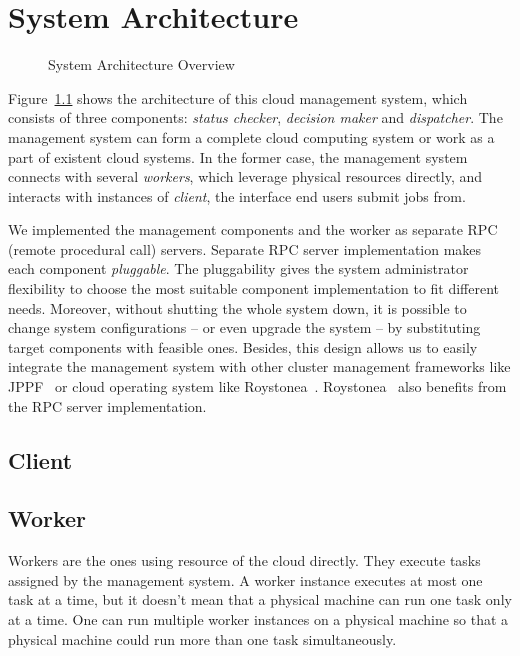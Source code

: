 \chapter{System Architecture}

\begin{figure}
  \centering
  
  \caption{System Architecture Overview}
  \label{fig:archi-overview}
\end{figure}


Figure~\ref{fig:archi-overview} shows the architecture of this cloud
management system, which consists of three components: \emph{status
checker}, \emph{decision maker} and \emph{dispatcher}.  The management
system can form a complete cloud computing system or work as a part of
existent cloud systems.  In the former case, the management system
connects with several \emph{workers}, which leverage physical resources
directly, and interacts with instances of \emph{client}, the interface
end users submit jobs from.

We implemented the management components and the worker as separate RPC
(remote procedural call) servers.  Separate RPC server implementation
makes each component \emph{pluggable}.  The pluggability gives the
system administrator flexibility to choose the most suitable component
implementation to fit different needs.  Moreover, without shutting the
whole system down, it is possible to change system configurations -- or
even upgrade the system -- by substituting target components with
feasible ones.  Besides, this design allows us to easily integrate the
management system with other cluster management frameworks like
JPPF~\cite{cite:JPPF} or cloud operating system like
Roystonea~\cite{cite:roystonea}.  Roystonea~\cite{cite:roystonea} also
benefits from the RPC server implementation.

\section{Client}

\section{Worker}

Workers are the ones using resource of the cloud directly.  They execute
tasks assigned by the management system.  A worker instance executes at
most one task at a time, but it doesn't mean that a physical machine can
run one task only at a time.  One can run multiple worker instances on a
physical machine so that a physical machine could run more than one task
simultaneously.	 

